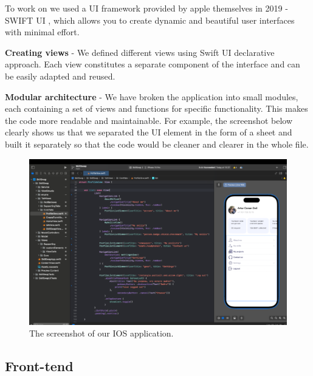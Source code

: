 \hrulefill 

To work on   we used a UI framework provided by apple themselves in 2019 - SWIFT UI \cite{swift}, which allows you to create dynamic and beautiful user interfaces with minimal effort. 

\textbf{Creating views} - We defined different views using Swift UI \cite{swift} declarative approach. Each view constitutes a separate component of the interface and can be easily adapted and reused.

\textbf{Modular architecture} - We have broken the application into small modules, each containing a set of views and functions for specific functionality. This makes the code more readable and maintainable.
For example, the screenshot below clearly shows us that we separated the UI element in the form of a sheet and built it separately so that the code would be cleaner and clearer in the whole file.

\begin{figure}[ht]\label{fig:screenios}
  \centering
  \includegraphics[width=0.8\linewidth]{figures/Screen IOS.png}
  \caption{The screenshot of our IOS application.}
\end{figure}

\subsection{Front-tend}\label{front}

